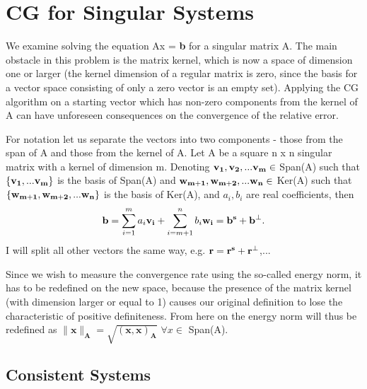 \chapter{CG for Singular Systems}

We examine solving the equation Ax = \textbf{b} for a singular matrix A. The main obstacle in this problem is the matrix kernel, which is now a space of dimension one or larger (the kernel dimension of a regular matrix is zero, since the basis for a vector space consisting of only a zero vector is an empty set). Applying the CG algorithm on a starting vector which has non-zero components from the kernel of A can have unforeseen consequences on the convergence of the relative error.

For notation let us separate the vectors into two components - those from the span of A and those from the kernel of A. Let A be a square n x n singular matrix with a kernel of dimension m. Denoting \( \bold{v_1,v_2,... v_m} \in\) Span(A) such that \(\bold{\{v_1,...v_m\}}\) is the basis of Span(A) and \( \bold{w_{m+1},w_{m+2},... w_n} \in\) Ker(A) such that \(\bold{\{w_{m+1},w_{m+2},... w_n\}}\) is the basis of Ker(A), and \(a_i, b_i\) are real coefficients,  then
\begin{equation}\label{b}
 \bold{b} = \sum_{i=1}^m{a_i \bold{v_i}} + \sum_{i=m+1}^n{b_i \bold{w_i}} = \bold{b^s + b^{\perp}}.
\end{equation}
I will split all other vectors the same way, e.g. \(\bold{r = r^s + r^{\perp}} \),...


Since we wish to measure the convergence rate using the so-called energy norm, it has to be redefined on the new space, because the presence of the matrix kernel (with dimension larger or equal to 1) causes our original definition to lose the characteristic of positive definiteness. 
From here on the energy norm will thus be redefined as \(\boldsymbol{\|x\|_{{A}} = \sqrt{(x,x)_{A}}}\)    \(\forall{x} \in\)  Span(A).

\section{Consistent Systems}

